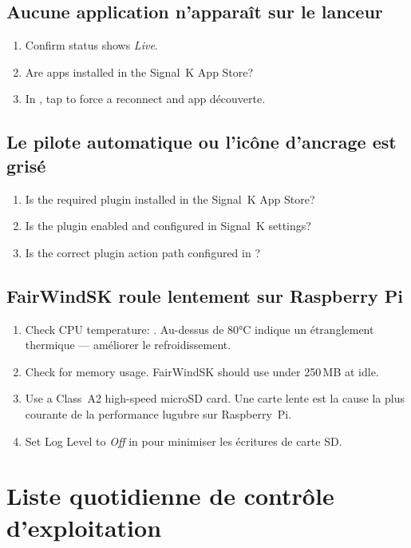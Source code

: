 \section{Aucune application n'apparaît sur le lanceur}

\begin{enumerate}
  \item Confirm status shows \textit{Live}.
  \item Are apps installed in the Signal~K App Store?
  \item In , tap  to force a reconnect and
app découverte.
\end{enumerate}

\section{Le pilote automatique ou l'icône d'ancrage est grisé}

\begin{enumerate}
  \item Is the required plugin installed in the Signal~K App Store?
  \item Is the plugin enabled and configured in Signal~K settings?
  \item Is the correct plugin action path configured in
        ?
\end{enumerate}

\section{FairWindSK roule lentement sur Raspberry Pi}

\begin{enumerate}
  \item Check CPU temperature: .
Au-dessus de 80°C indique un étranglement thermique --- améliorer le refroidissement.
  \item Check  for memory usage.
        FairWindSK should use under 250\,MB at idle.
  \item Use a Class~A2 high-speed microSD card.
Une carte lente est la cause la plus courante de la performance lugubre sur Raspberry~Pi.
  \item Set Log Level to \textit{Off} in 
pour minimiser les écritures de carte SD.
\end{enumerate}

\chapter{Liste quotidienne de contrôle d'exploitation}
\label{ch:checklist}

